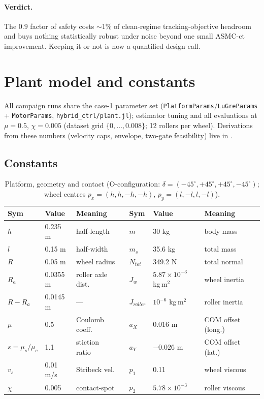 \documentclass[11pt]{article}
\begin{document}
\paragraph{Verdict.} The $0.9$ factor of safety costs $\sim$1\% of clean-regime
tracking-objective headroom and buys nothing statistically robust under noise beyond
one small ASMC-ct improvement. Keeping it or not is now a quantified design call.

\appendix
\sloppy
\section{Plant model and constants}
\label{app:plant}

All campaign runs share the case-1 parameter set
(\texttt{PlatformParams}/\texttt{LuGreParams} + \texttt{MotorParams},
\texttt{hybrid\_ctrl/plant.jl}); estimator tuning and all evaluations at
$\mu=0.5$, $\chi=0.005$ (dataset grid $\{0,\ldots,0.008\}$; 12 rollers per wheel). Derivations from these numbers (velocity caps, envelope,
two-gate feasibility) live in
.

\subsection{Constants}

\begin{table}[h]\centering\footnotesize
\caption{Platform, geometry and contact (O-configuration:
$\delta=(-45^\circ,+45^\circ,+45^\circ,-45^\circ)$; wheel centres
$p_x=(h,h,-h,-h)$, $p_y=(l,-l,l,-l)$).}
\label{tab:platform}
\begin{tabular}{llll@{\hskip 2em}llll}
\toprule
Sym & Value & Meaning & & Sym & Value & Meaning\\
\midrule
$h$ & 0.235 m & half-length & & $m$ & 30 kg & body mass\\
$l$ & 0.15 m & half-width & & $m_s$ & 35.6 kg & total mass\\
$R$ & 0.05 m & wheel radius & & $N_{tot}$ & 349.2 N & total normal\\
$R_a$ & 0.0355 m & roller axle dist. & & $J_w$ & $5.87\!\times\!10^{-3}$ kg\,m$^2$ & wheel inertia\\
$R-R_a$ & 0.0145 m & --- & & $J_{roller}$ & $10^{-6}$ kg\,m$^2$ & roller inertia\\
$\mu$ & 0.5 & Coulomb coeff. & & $a_X$ & 0.016 m & COM offset (long.)\\
$s=\mu_s/\mu_c$ & 1.1 & stiction ratio & & $a_Y$ & $-0.026$ m & COM offset (lat.)\\
$v_s$ & 0.01 m/s & Stribeck vel. & & $p_1$ & 0.11 & wheel viscous\\
$\chi$ & 0.005 & contact-spot & & $p_2$ & $5.78\!\times\!10^{-3}$ & roller viscous\\
\bottomrule
\end{tabular}
\end{table}
\end{document}
